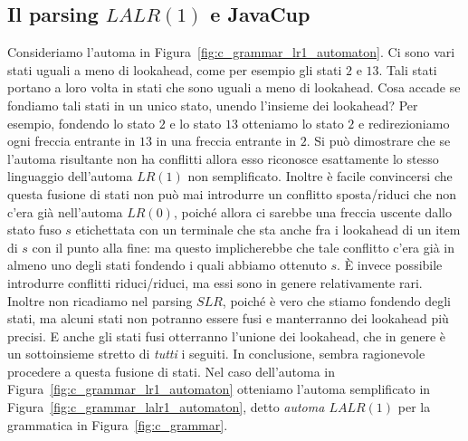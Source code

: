\subsection{Il parsing $\mathit{LALR}(1)$ e JavaCup}\label{subsec:lalr1}
%
Consideriamo l'automa in Figura~\ref{fig:c_grammar_lr1_automaton}.
Ci sono vari stati uguali a meno di lookahead, come per esempio gli stati
$2$ e $13$. Tali stati portano a loro volta in stati che sono uguali a meno
di lookahead. Cosa accade se fondiamo tali stati in un unico stato,
unendo l'insieme dei lookahead? Per esempio, fondendo lo stato $2$ e lo
stato $13$ otteniamo lo stato $2$ e redirezioniamo ogni freccia entrante in
$13$ in una freccia entrante in $2$. Si pu\`o dimostrare che se l'automa
risultante non ha conflitti allora esso riconosce esattamente lo stesso
linguaggio dell'automa $\mathit{LR}(1)$ non semplificato. Inoltre \`e facile
convincersi che questa fusione di stati non pu\`o mai introdurre un
conflitto sposta/riduci che non c'era gi\`a nell'automa $\mathit{LR}(0)$,
poich\'e allora ci sarebbe una freccia uscente dallo stato fuso $s$ etichettata
con un terminale che sta anche fra i lookahead di un item di $s$ con il punto
alla fine: ma questo implicherebbe che tale conflitto c'era gi\`a in almeno
uno degli stati fondendo i quali abbiamo ottenuto $s$. \`E invece possibile
introdurre conflitti riduci/riduci, ma essi sono in genere relativamente rari.
Inoltre non ricadiamo nel parsing $\mathit{SLR}$, poich\'e \`e vero che
stiamo fondendo degli stati, ma alcuni stati non potranno essere fusi
e manterranno dei lookahead pi\`u precisi. E anche gli stati fusi
otterranno l'unione dei lookahead, che in genere \`e un sottoinsieme stretto
di \emph{tutti} i seguiti. In conclusione, sembra ragionevole procedere a
questa fusione di stati. Nel caso dell'automa in
Figura~\ref{fig:c_grammar_lr1_automaton} otteniamo l'automa semplificato
in Figura~\ref{fig:c_grammar_lalr1_automaton}, detto
\emph{automa $\mathit{LALR}(1)$} per la grammatica in
Figura~\ref{fig:c_grammar}.
%
